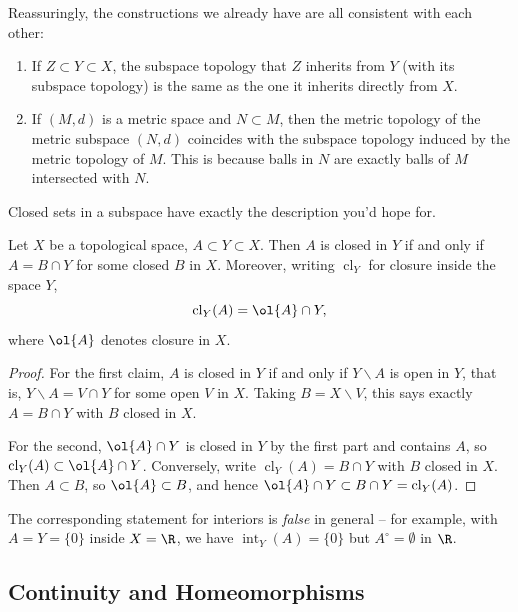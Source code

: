 \begin{remark}
    Reassuringly, the constructions we already have are all consistent with each other:
    \begin{enumerate}[label=(\roman*)]
        \item If $Z \subset Y \subset X$, the subspace topology that $Z$ inherits from $Y$ (with its subspace topology) is the same as the one it inherits directly from $X$.
        \item If $(M, d)$ is a metric space and $N \subset M$, then the metric topology of the metric subspace $(N, d)$ coincides with the subspace topology induced by the metric topology of $M$. This is because balls in $N$ are exactly balls of $M$ intersected with $N$.
    \end{enumerate}
\end{remark}

Closed sets in a subspace have exactly the description you'd hope for.

\begin{proposition}
    Let $X$ be a topological space, $A \subset Y \subset X$. Then $A$ is closed in $Y$ if and only if $A = B \cap Y$ for some closed $B$ in $X$. Moreover, writing $\operatorname{cl}_Y$ for closure inside the space $Y$,
    $$
    \operatorname{cl}_Y(A) = \ol{A} \cap Y,
    $$
    where $\ol{A}$ denotes closure in $X$.
\end{proposition}
\begin{proof}
    For the first claim, $A$ is closed in $Y$ if and only if $Y \backslash A$ is open in $Y$, that is, $Y \backslash A = V \cap Y$ for some open $V$ in $X$. Taking $B = X \backslash V$, this says exactly $A = B \cap Y$ with $B$ closed in $X$.

    For the second, $\ol{A} \cap Y$ is closed in $Y$ by the first part and contains $A$, so $\operatorname{cl}_Y(A) \subset \ol{A} \cap Y$. Conversely, write $\operatorname{cl}_Y(A) = B \cap Y$ with $B$ closed in $X$. Then $A \subset B$, so $\ol{A} \subset B$, and hence $\ol{A} \cap Y \subset B \cap Y = \operatorname{cl}_Y(A)$.
\end{proof}

The corresponding statement for interiors is \emph{false} in general -- for example, with $A = Y = \{0\}$ inside $X = \R$, we have $\operatorname{int}_Y(A) = \{0\}$ but $A^{\circ} = \emptyset$ in $\R$.

\subsection{Continuity and Homeomorphisms}

